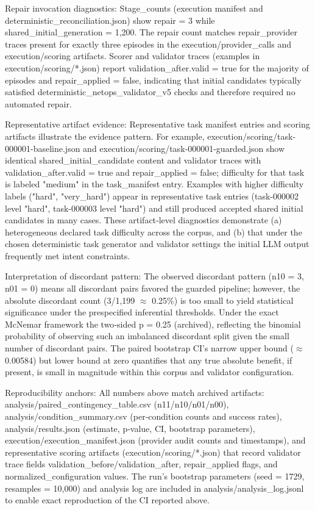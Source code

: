 \documentclass[conference]{IEEEtran}
\begin{document}
Repair invocation diagnostics: Stage\_counts (execution manifest and deterministic\_reconciliation.json) show repair = 3 while shared\_initial\_generation = 1,200. The repair count matches repair\_provider traces present for exactly three episodes in the execution/provider\_calls and execution/scoring artifacts. Scorer and validator traces (examples in execution/scoring/*.json) report validation\_after.valid = true for the majority of episodes and repair\_applied = false, indicating that initial candidates typically satisfied deterministic\_netops\_validator\_v5 checks and therefore required no automated repair.

Representative artifact evidence: Representative task manifest entries and scoring artifacts illustrate the evidence pattern. For example, execution/scoring/task-000001-baseline.json and execution/scoring/task-000001-guarded.json show identical shared\_initial\_candidate content and validator traces with validation\_after.valid = true and repair\_applied = false; difficulty for that task is labeled "medium" in the task\_manifest entry. Examples with higher difficulty labels ("hard", "very\_hard") appear in representative task entries (task-000002 level "hard", task-000003 level "hard") and still produced accepted shared initial candidates in many cases. These artifact‑level diagnostics demonstrate (a) heterogeneous declared task difficulty across the corpus, and (b) that under the chosen deterministic task generator and validator settings the initial LLM output frequently met intent constraints.

Interpretation of discordant pattern: The observed discordant pattern (n10 = 3, n01 = 0) means all discordant pairs favored the guarded pipeline; however, the absolute discordant count (3/1,199 \ensuremath{\approx} 0.25\%) is too small to yield statistical significance under the prespecified inferential thresholds. Under the exact McNemar framework the two‑sided p = 0.25 (archived), reflecting the binomial probability of observing such an imbalanced discordant split given the small number of discordant pairs. The paired bootstrap CI's narrow upper bound (\ensuremath{\approx}0.00584) but lower bound at zero quantifies that any true absolute benefit, if present, is small in magnitude within this corpus and validator configuration.

Reproducibility anchors: All numbers above match archived artifacts: analysis/paired\_contingency\_table.csv (n11/n10/n01/n00), analysis/condition\_summary.csv (per‑condition counts and success rates), analysis/results.json (estimate, p‑value, CI, bootstrap parameters), execution/execution\_manifest.json (provider audit counts and timestamps), and representative scoring artifacts (execution/scoring/*.json) that record validator trace fields validation\_before/validation\_after, repair\_applied flags, and normalized\_configuration values. The run's bootstrap parameters (seed = 1729, resamples = 10,000) and analysis log are included in analysis/analysis\_log.jsonl to enable exact reproduction of the CI reported above.
\end{document}
